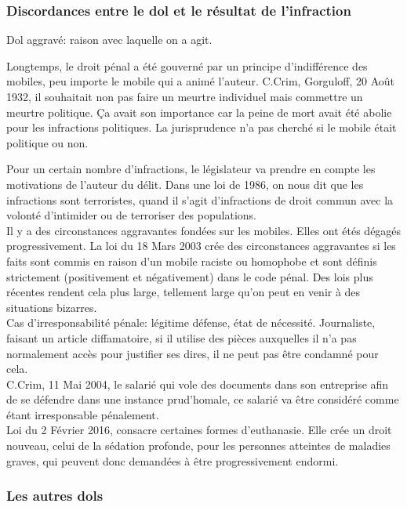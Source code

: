 \documentclass[10pt, a4paper, openany]{book}
\begin{document}
\subsubsection{Discordances entre le dol et le résultat de l'infraction}

Dol aggravé: raison avec laquelle on a agit. 


Longtemps, le droit pénal a été gouverné par un principe d'indifférence des mobiles, peu importe le mobile qui a animé l'auteur. C.Crim, Gorguloff, 20 Août 1932, il souhaitait non pas faire un meurtre individuel mais commettre un meurtre politique. Ça avait son importance car la peine de mort avait été abolie pour les infractions politiques. La jurisprudence n'a pas cherché si le mobile était politique ou non. 


Pour un certain nombre d'infractions, le législateur va prendre en compte les motivations de l'auteur du délit. Dans une loi de 1986, on nous dit que les infractions sont terroristes, quand il s'agit d'infractions de droit commun avec la volonté d'intimider ou de terroriser des populations. \\
Il y a des circonstances aggravantes fondées sur les mobiles. Elles ont étés dégagés progressivement. La loi du 18 Mars 2003 crée des circonstances aggravantes si les faits sont commis en raison d'un mobile raciste ou homophobe et sont définis strictement (positivement et négativement) dans le code pénal. Des lois plus récentes rendent cela plus large, tellement large qu'on peut en venir à des situations bizarres. \\
Cas d'irresponsabilité pénale: légitime défense, état de nécessité. Journaliste, faisant un article diffamatoire, si il utilise des pièces auxquelles il n'a pas normalement accès pour justifier ses dires, il ne peut pas être condamné pour cela. \\
C.Crim, 11 Mai 2004, le salarié qui vole des documents dans son entreprise afin de se défendre dans une instance prud’homale, ce salarié va être considéré comme étant irresponsable pénalement. \\
Loi du 2 Février 2016, consacre certaines formes d'euthanasie. Elle crée un droit nouveau, celui de la sédation profonde, pour les personnes atteintes de maladies graves, qui peuvent donc demandées à être progressivement endormi. 

\subsubsection{Les autres dols}
\end{document}
